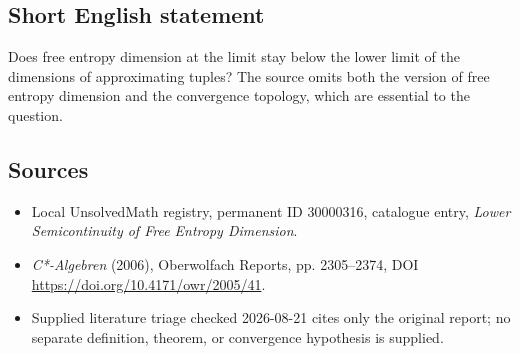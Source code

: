 \documentclass[11pt]{article}
\begin{document}
\subsection{Short English statement}
Does free entropy dimension at the limit stay below the lower limit of the dimensions of approximating tuples? The source omits both the version of free entropy dimension and the convergence topology, which are essential to the question.
\subsection{Sources}
\begin{itemize}
\item Local UnsolvedMath registry, permanent ID 30000316, catalogue entry, \emph{Lower Semicontinuity of Free Entropy Dimension}.
\item \emph{C*-Algebren} (2006), Oberwolfach Reports, pp. 2305--2374, DOI \url{https://doi.org/10.4171/owr/2005/41}.
\item Supplied literature triage checked 2026-08-21 cites only the original report; no separate definition, theorem, or convergence hypothesis is supplied.
\end{itemize}
\end{document}
